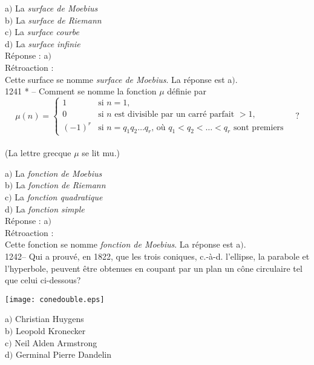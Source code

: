 ﻿\documentclass[letterpaper, 12pt]{article}
\begin{document}
a$)$ La {\sl surface de Moebius} \\
b$)$ La {\sl surface de Riemann} \\
c$)$ La {\sl surface courbe} \\
d$)$ La {\sl surface infinie}\\

R\'eponse : a$)$\\

R\'etroaction : \\
Cette surface se nomme {\sl surface de Moebius}.
La r\'eponse est a$)$.\\

1241 * -- Comment se nomme la fonction $\mu$ d\'efinie par
$$\mu(n)=\begin{cases}
1&\text{si $n=1$,}\\[3mm]
0&\text{si $n$ est divisible par un carr\'e parfait $>1$,}\\[3mm]
(-1)^r&\text{si $n=q_1q_2\ldots q_r$, o\`u $q_1<q_2<\ldots<q_r$ sont
premiers}
\end{cases}\quad?$$\\
(La lettre grecque $\mu$ se lit mu.)

a$)$ La {\sl fonction de Moebius} \\
b$)$ La {\sl fonction de Riemann} \\
c$)$ La {\sl fonction quadratique} \\
d$)$ La {\sl fonction simple}\\

R\'eponse : a$)$\\

R\'etroaction : \\
Cette fonction se nomme {\sl fonction de Moebius}.
La r\'eponse est a$)$.\\

1242-- Qui a prouv\'e, en 1822, que les trois coniques, c.-\`a-d.
l'ellipse, la parabole et l'hyperbole, peuvent \^etre obtenues en
coupant par un plan un c\^one circulaire tel que celui ci-dessous?
    \begin{center}
    \texttt{[image: conedouble.eps]}
    \end{center}


a$)$ Christian Huygens \\
b$)$ Leopold Kronecker \\
c$)$ Neil Alden Armstrong \\
d$)$ Germinal Pierre Dandelin\\
\end{document}
